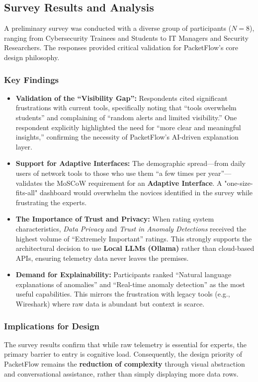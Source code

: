 \documentclass[
    11pt, 
    a4paper, 
    parskip=half, 
    headsepline,       %
    DIV=12             %
]{scrartcl}
\begin{document}
\subsection{Survey Results and Analysis}
A preliminary survey was conducted with a diverse group of participants ($N=8$), ranging from Cybersecurity Trainees and Students to IT Managers and Security Researchers. The responses provided critical validation for PacketFlow's core design philosophy.

\subsubsection{Key Findings}

\begin{itemize}
    \item \textbf{Validation of the ``Visibility Gap'':}
    Respondents cited significant frustrations with current tools, specifically noting that ``tools overwhelm students'' and complaining of ``random alerts and limited visibility.'' One respondent explicitly highlighted the need for ``more clear and meaningful insights,'' confirming the necessity of PacketFlow's AI-driven explanation layer.

    \item \textbf{Support for Adaptive Interfaces:}
    The demographic spread—from daily users of network tools to those who use them ``a few times per year''—validates the MoSCoW requirement for an \textbf{Adaptive Interface}. A "one-size-fits-all" dashboard would overwhelm the novices identified in the survey while frustrating the experts.

    \item \textbf{The Importance of Trust and Privacy:}
    When rating system characteristics, \textit{Data Privacy} and \textit{Trust in Anomaly Detections} received the highest volume of ``Extremely Important'' ratings. This strongly supports the architectural decision to use \textbf{Local LLMs (Ollama)} rather than cloud-based APIs, ensuring telemetry data never leaves the premises.

    \item \textbf{Demand for Explainability:}
    Participants ranked ``Natural language explanations of anomalies'' and ``Real-time anomaly detection'' as the most useful capabilities. This mirrors the frustration with legacy tools (e.g., Wireshark) where raw data is abundant but context is scarce.
\end{itemize}

\subsubsection{Implications for Design}
The survey results confirm that while raw telemetry is essential for experts, the primary barrier to entry is cognitive load. Consequently, the design priority of PacketFlow remains the \textbf{reduction of complexity} through visual abstraction and conversational assistance, rather than simply displaying more data rows.
\end{document}
